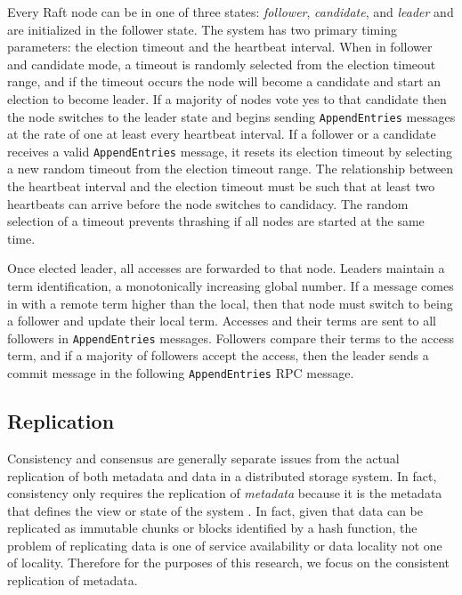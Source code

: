 \documentclass{article}
\begin{document}
Every Raft node can be in one of three states: \textit{follower}, \textit{candidate}, and \textit{leader} and are initialized in the follower state. The system has two primary timing parameters: the election timeout and the heartbeat interval. When in follower and candidate mode, a timeout is randomly selected from the election timeout range, and if the timeout occurs the node will become a candidate and start an election to become leader. If a majority of nodes vote yes to that candidate then the node switches to the leader state and begins sending \texttt{AppendEntries} messages at the rate of one at least every heartbeat interval. If a follower or a candidate receives a valid \texttt{AppendEntries} message, it resets its election timeout by selecting a new random timeout from the election timeout range. The relationship between the heartbeat interval and the election timeout must be such that at least two heartbeats can arrive before the node switches to candidacy. The random selection of a timeout prevents thrashing if all nodes are started at the same time.

Once elected leader, all accesses are forwarded to that node. Leaders maintain a term identification, a monotonically increasing global number. If a message comes in with a remote term higher than the local, then that node must switch to being a follower and update their local term. Accesses and their terms are sent to all followers in \texttt{AppendEntries} messages. Followers compare their terms to the access term, and if a majority of followers accept the access, then the leader sends a commit message in the following \texttt{AppendEntries} RPC message.


\subsection{Replication}
\label{sec:replication}

Consistency and consensus are generally separate issues from the actual replication of both metadata and data in a distributed storage system. In fact, consistency only requires the replication of \emph{metadata} because it is the metadata that defines the view or state of the system \cite{chandy_distributed_1985}. In fact, given that data can be replicated as immutable chunks or blocks identified by a hash function, the problem of replicating data is one of service availability \cite{venkataramani_operating_2002} or data locality \cite{kuenning_automated_1997} not one of locality. Therefore for the purposes of this research, we focus on the consistent replication of metadata.
\end{document}
